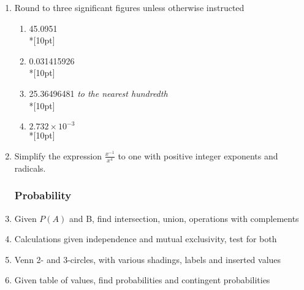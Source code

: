 \documentclass[12pt, oneside]{article}
\begin{document}
\begin{enumerate}
\item Round to three significant figures unless otherwise instructed
\begin{enumerate}
    \item 45.0951\\*[10pt]
    \item 0.031415926\\*[10pt]
    \item 25.36496481 \emph{to the nearest hundredth}\\*[10pt]
    \item $2.732 \times 10^{-3}$\\*[10pt]
\end{enumerate}

\item Simplify the expression $\displaystyle \frac{x^{-1}}{x^4}$ to one with positive integer exponents and radicals.

\newpage
\subsubsection*{Probability}
\item Given $P(A)$ and B, find intersection, union, operations with complements
\item Calculations given independence and mutual exclusivity, test for both
\item Venn 2- and 3-circles, with various shadings, labels and inserted values
\item Given table of values, find probabilities and contingent probabilities


\end{enumerate}
\end{document}
